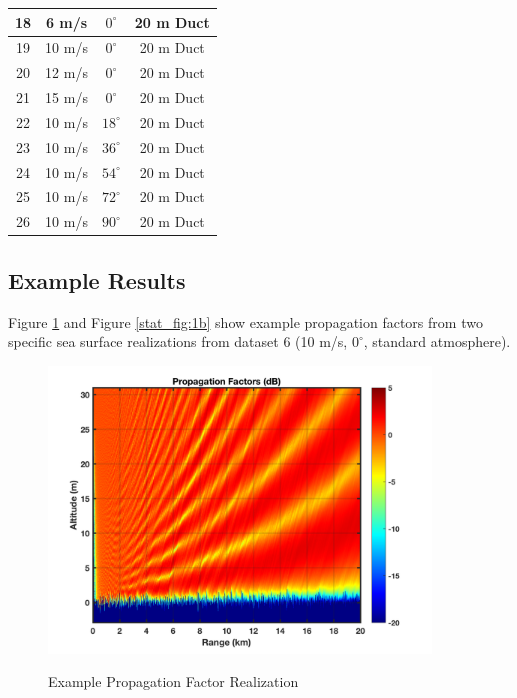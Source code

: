 \begin{table}[H]
\begin{center}
\begin{tabular} {|c | c | c| c |}
  18 & 6 m/s & $0^{\circ}$ & 20 m Duct \\ \hline
  19 & 10 m/s & $0^{\circ}$ & 20 m Duct \\ \hline
  20 & 12 m/s & $0^{\circ}$ & 20 m Duct \\ \hline
  21 & 15 m/s & $0^{\circ}$ & 20 m Duct \\ \hline
  22 & 10 m/s & $18^{\circ}$ & 20 m Duct \\ \hline
  23 & 10 m/s & $36^{\circ}$ & 20 m Duct \\ \hline
  24 & 10 m/s & $54^{\circ}$ & 20 m Duct \\ \hline
  25 & 10 m/s & $72^{\circ}$ & 20 m Duct \\ \hline
  26 & 10 m/s & $90^{\circ}$ & 20 m Duct \\ \hline
\end{tabular}
\end{center}
\end{table}
\renewcommand{\baselinestretch}{2} \small\normalsize

\subsection{Example Results}
Figure \ref{stat_fig:1a} and Figure \ref{stat_fig:1b} show example propagation factors from two specific sea surface realizations from dataset $6$ (10 m/s, $0^{\circ}$, standard atmosphere).

\begin{figure}[H]
  \begin{center}
\includegraphics[width=4in]{../media/statistics/pf_1.png}
  \end{center}
  \renewcommand{\baselinestretch}{1} \small\normalsize
  \begin{quote}
    \caption[Example Propagation Factor Realization]{Example Propagation Factor Realization\label{stat_fig:1a}}
  \end{quote}
\end{figure}
\renewcommand{\baselinestretch}{2} \small\normalsize

